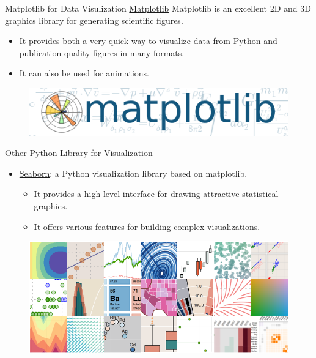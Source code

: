 \documentclass{bredelebeamer}
\begin{document}
\begin{frame}{Matplotlib for Data Visulization}
\href{https://matplotlib.org/}{Matplotlib} Matplotlib is an excellent 2D and 3D graphics library for generating scientific figures.\\
 \begin{itemize}
 	\item It provides both a very quick way to visualize data from Python and publication-quality figures in many formats.
 	\item It can also be used for animations.
 \end{itemize}
 \begin{figure}{}
\includegraphics[scale=0.50]{../image/matlibplot.png}
\end{figure}
\end{frame}

\begin{frame}{Other Python Library for Visualization}

 \begin{itemize}
 	\item \href{https://seaborn.pydata.org/}{Seaborn}: a Python visualization library based on matplotlib. 
    \begin{itemize}
 	\item It provides a high-level interface for drawing attractive statistical graphics.
 	\item It offers various features for building complex visualizations.
    \end{itemize}
 \end{itemize}
 \begin{figure}{}
\includegraphics[scale=0.30]{../image/searborn.png}
\end{figure}
\end{frame}
\end{document}
